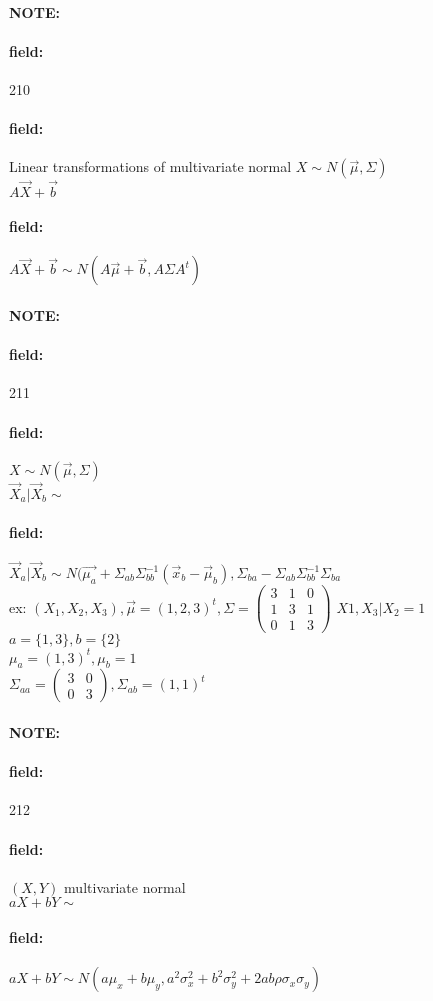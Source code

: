 \documentclass[12pt]{article}
\newenvironment{note}{\paragraph{NOTE:}}{}
\newenvironment{field}{\paragraph{field:}}{}
\begin{document}
\begin{note} \begin{field} \tiny 210 \end{field}
  \begin{field}
    Linear transformations of multivariate normal $X \sim N(\vec{\mu},\Sigma) $\\
    $A \vec{X} + \vec{b}$
  \end{field}
  \begin{field}
    $A \vec{X} + \vec{b} \sim N(A \vec{\mu} + \vec{b}, A \Sigma A^t)$
  \end{field}
\end{note}

\begin{note} \begin{field} \tiny 211 \end{field}
  \begin{field}
    $X \sim N(\vec{\mu},\Sigma) $\\

    $\vec{X}_a | \vec{X}_b \sim $
  \end{field}
  \begin{field}
    $\vec{X}_a | \vec{X}_b \sim N\big(\vec{\mu_a} + \Sigma_{ab} \Sigma^{-1}_{bb}(\vec{x}_b - \vec{\mu}_b), \Sigma_{ba} - \Sigma_{ab}\Sigma_{bb}^{-1}\Sigma_{ba}$\\

ex: $(X_1,X_2,X_3), \vec{\mu} = (1,2,3)^t, \Sigma = \begin{pmatrix}
  3 & 1 & 0 \\ 1 & 3 & 1 \\ 0 & 1 & 3
\end{pmatrix}$
$X1,X_3 | X_2 = 1$\\
$a = \{1,3\}, b = \{2\}$\\
$\mu_a = (1,3)^t, \mu_b = 1$\\
$\Sigma_{aa} = \begin{pmatrix}
  3 & 0 \\ 0 & 3
\end{pmatrix}, \Sigma_{ab} = (1,1)^t$

  \end{field}
\end{note}

\begin{note} \begin{field} \tiny 212 \end{field}
  \begin{field}
    $(X,Y)$ multivariate normal \\
    $aX + bY \sim $
  \end{field}
  \begin{field}
    $aX + bY \sim N(a \mu_x + b\mu_y, a^2 \sigma_x^2 + b^2 \sigma_y^2 + 2 ab \rho \sigma_x \sigma_y)$
  \end{field}
\end{note}
\end{document}
